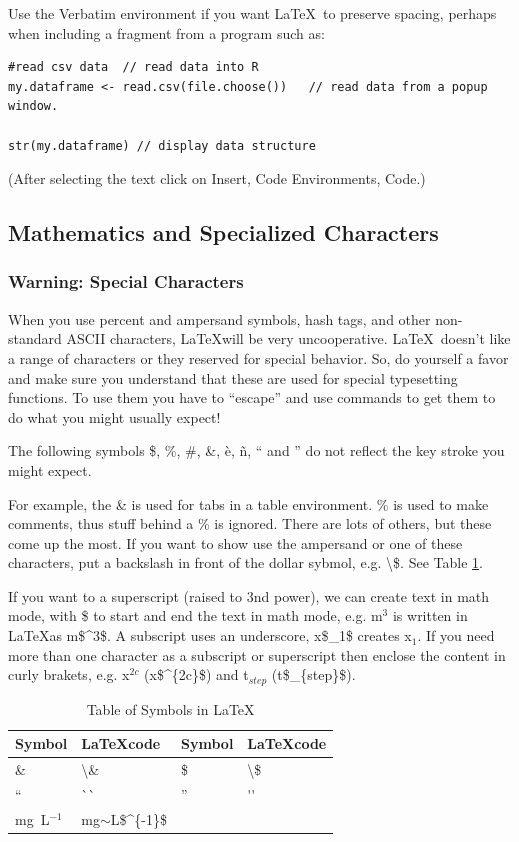 \documentclass{book}\usepackage{knitr}
\begin{document}
Use the Verbatim environment if you want \LaTeX\ to preserve spacing, perhaps when
including a fragment from a program such as:
\begin{verbatim}
#read csv data  // read data into R
my.dataframe <- read.csv(file.choose())   // read data from a popup window.

str(my.dataframe) // display data structure

\end{verbatim}
(After selecting the text click on Insert, Code Environments, Code.)


\subsection{Mathematics and Specialized Characters}\label{sub:mathchar}

\subsubsection*{Warning: Special Characters}

When you use percent and ampersand symbols, hash tags, and other non-standard ASCII characters, \LaTeX will be very uncooperative. \LaTeX~doesn't like a range of characters or they reserved for special behavior. So, do yourself a favor and make sure you understand that these are used for special typesetting functions. To use them you have to ``escape'' and use commands to get them to do what you might usually expect!  

The following symbols \$, \%, \#, \&, \`e, \~n, `` and '' do not reflect the key stroke you might expect. 

For example, the \& is used for tabs in a table environment. \% is used to make comments, thus stuff behind a \% is ignored. There are lots of others, but these come up the most. If you want to show use the ampersand or one of these characters, put a backslash in front of the dollar sybmol, e.g. \textbackslash\$. See Table \ref{tab:tableofsymbols}.

If you want to a superscript (raised to 3nd power), we can create text in math mode, with \$ to start and end the text in math mode, e.g. m$^3$ is written in \LaTeX as m\$\^{}3\$. A subscript uses an underscore, x\$\_1\$ creates x$_1$. If you need more than one character as a subscript or superscript then enclose the content in curly brakets, e.g. x$^{2c}$ (x\$\^{}\{2c\}\$) and t$_{step}$ (t\$\_\{step\}\$).

\begin{table}[h]
\caption{Table of Symbols in \LaTeX}
\label{tab:tableofsymbols}
\begin{tabular}{|ll|ll|} \hline
Symbol  & \LaTeX code & Symbol & \LaTeX code \\ \hline\hline
\&  & \textbackslash\&  & 
\$  & \textbackslash\$ \\
``  & \`{}\`{} & 
''  & \'{}\'{} \\
mg~L$^{-1}$ & mg$\sim${}L\$\^{}\{-1\}\$ & 
    & \\ 
\hline
\end{tabular}

\end{table}
\end{document}
